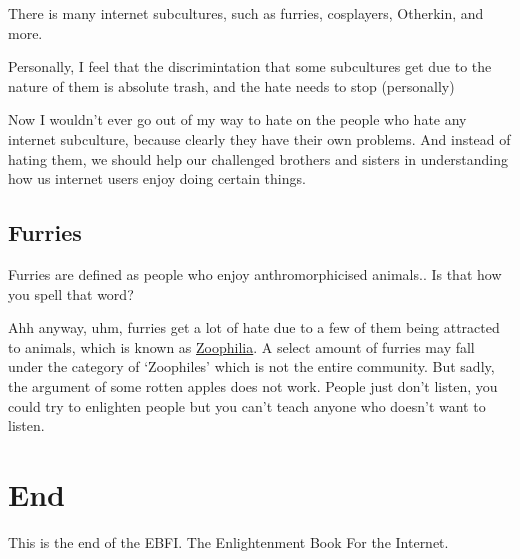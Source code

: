 \documentclass{article} %
\begin{document}
  There is many internet subcultures, such as furries, cosplayers, Otherkin, and more.

  Personally, I feel that the discrimintation that some
  subcultures get due to the nature of them is absolute trash, 
  and the hate needs to stop (personally)

  Now I wouldn't ever go out of my way to hate on the people
  who hate any internet subculture, because clearly they have their own problems. And
  instead of hating them, we should help our challenged brothers and sisters in understanding
  how us internet users enjoy doing certain things.

  \subsection{Furries}

  Furries are defined as people who enjoy anthromorphicised animals.. Is that how you spell that word?

  Ahh anyway, uhm, furries get a lot of hate due to a few of them being attracted to animals, which
  is known as \href{https://en.wikipedia.org/wiki/Zoophilia}{Zoophilia}.
  A select amount of furries may fall under the category of `Zoophiles' which is not the entire community.
  But sadly, the argument of some rotten apples does not work. People just don't listen,
  you could try to enlighten people but you can't teach anyone who doesn't want to listen.
  
  \section{End}

  This is the end of the EBFI\@. The Enlightenment Book For the Internet.
\end{document}
